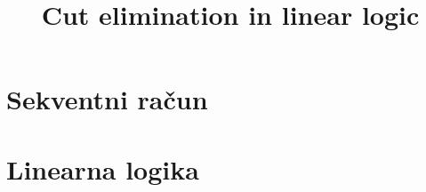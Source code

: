 \documentclass[mat1, tisk]{fmfdelo}
\title{Cut elimination in linear logic}
\begin{document}

\section{Sekventni račun} \label{seq_calc}


\section{Linearna logika}


\end{document}
